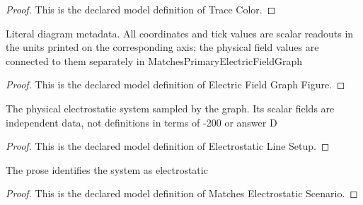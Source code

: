 \begin{proof}
  This is the declared model definition of Trace Color.
\end{proof}
\begin{definition}
  \label{def:physics:phyx-mini-0869:phyxminiproblems-problemphyxmini0869-electricfieldgraphfigure}
  Literal diagram metadata. All coordinates and tick values are scalar readouts in the units printed on the corresponding axis; the physical field values are connected to them separately in MatchesPrimaryElectricFieldGraph
\end{definition}
\begin{proof}
  This is the declared model definition of Electric Field Graph Figure.
\end{proof}
\begin{definition}
  \label{def:physics:phyx-mini-0869:phyxminiproblems-problemphyxmini0869-electrostaticlinesetup}
  The physical electrostatic system sampled by the graph. Its scalar fields are independent data, not definitions in terms of -200 or answer D
\end{definition}
\begin{proof}
  This is the declared model definition of Electrostatic Line Setup.
\end{proof}
\begin{definition}
  \label{def:physics:phyx-mini-0869:phyxminiproblems-problemphyxmini0869-matcheselectrostaticscenario}
  The prose identifies the system as electrostatic
\end{definition}
\begin{proof}
  This is the declared model definition of Matches Electrostatic Scenario.
\end{proof}
